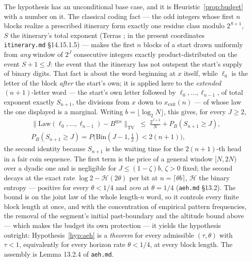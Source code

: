 \documentclass[11pt]{article}
\theoremstyle{remark}
\newcommand{\Ent}{\mathcal{H}}
\begin{document}
The hypothesis has an unconditional base case, and it is Heuristic~\ref{prop:budget}
with a number on it. The classical coding fact --- the odd integers whose first $n$
blocks realize a prescribed itinerary form exactly one residue class modulo
$2^{S+1}$, $S$ the itinerary's total exponent (Terras \cite{terras}; in the present
coordinates \texttt{itinerary.md} \S14.15.1.5) --- makes the first $n$ blocks of a
start drawn uniformly from \emph{any} window of $2^{J}$ consecutive integers
exactly product-distributed on the event $S + 1 \le J$: the event that the itinerary
has not outspent the start's supply of binary digits. That fact is about the word
beginning at $x$ itself, while $\ell_0$ is the letter of the block \emph{after} the
start's own; it is applied here to the \emph{extended} $(n+1)$-letter word --- the
start's own letter followed by $\ell_0,\dots,\ell_{n-1}$, of total exponent exactly
$S_{n+1}$, the divisions from $x$ down to $x_{\mathrm{exit}}(n)$ --- of whose law
the one displayed is a marginal. Writing
$b = \lfloor\log_2 N\rfloor$, this gives, for every $J \ge 2$,
\[
  \begin{gathered}
    \bigl\lVert \mathrm{Law}(\ell_0,\dots,\ell_{n-1}) - B^{\otimes n}
      \bigr\rVert_{\mathrm{TV}}
    \;\le\; \frac{2^{J+2}}{N} + P_B(S_{n+1} \ge J), \\[2pt]
    P_B(S_{n+1} \ge J) = P\bigl(\mathrm{Bin}(J-1,\tfrac12) < 2(n+1)\bigr),
  \end{gathered}
\]
the second identity because $S_{n+1}$ is the waiting time for the $2(n+1)$-th
head in a fair coin sequence. The first term is the price of a general window
$[N,2N)$ over a dyadic one and is negligible for $J \le (1-\zeta)b$, $\zeta > 0$ fixed; the second
decays at the exact rate $\log 2 - \Ent(2\theta)$ per bit at $n = \lceil\theta b\rceil$,
$\Ent$ the binary entropy --- positive for every $\theta < 1/4$ and \emph{zero} at
$\theta = 1/4$ (\texttt{aeh.md} \S13.2). The bound is on the joint law of the whole
length-$n$ word, so it controls every finite block length at once, and with the
concentration of empirical pattern frequencies, the removal of the segment's initial
past-boundary and the altitude bound above --- which makes the budget its own
protection --- it yields the hypothesis outright:
Hypothesis~\ref{hyp:aeh} is a \emph{theorem} for every admissible $(\tau,\theta)$
with $\tau < 1$, equivalently for every horizon rate $\theta < 1/4$, at every
block length. The assembly is Lemma 13.2.4 of \texttt{aeh.md}.
\end{document}
